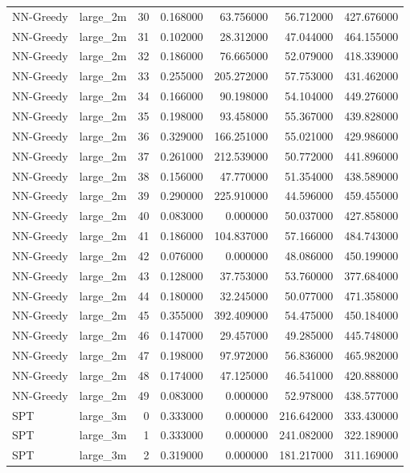 \begin{tabular}{llrrrrr}
NN-Greedy & large_2m & 30 & 0.168000 & 63.756000 & 56.712000 & 427.676000 \\
NN-Greedy & large_2m & 31 & 0.102000 & 28.312000 & 47.044000 & 464.155000 \\
NN-Greedy & large_2m & 32 & 0.186000 & 76.665000 & 52.079000 & 418.339000 \\
NN-Greedy & large_2m & 33 & 0.255000 & 205.272000 & 57.753000 & 431.462000 \\
NN-Greedy & large_2m & 34 & 0.166000 & 90.198000 & 54.104000 & 449.276000 \\
NN-Greedy & large_2m & 35 & 0.198000 & 93.458000 & 55.367000 & 439.828000 \\
NN-Greedy & large_2m & 36 & 0.329000 & 166.251000 & 55.021000 & 429.986000 \\
NN-Greedy & large_2m & 37 & 0.261000 & 212.539000 & 50.772000 & 441.896000 \\
NN-Greedy & large_2m & 38 & 0.156000 & 47.770000 & 51.354000 & 438.589000 \\
NN-Greedy & large_2m & 39 & 0.290000 & 225.910000 & 44.596000 & 459.455000 \\
NN-Greedy & large_2m & 40 & 0.083000 & 0.000000 & 50.037000 & 427.858000 \\
NN-Greedy & large_2m & 41 & 0.186000 & 104.837000 & 57.166000 & 484.743000 \\
NN-Greedy & large_2m & 42 & 0.076000 & 0.000000 & 48.086000 & 450.199000 \\
NN-Greedy & large_2m & 43 & 0.128000 & 37.753000 & 53.760000 & 377.684000 \\
NN-Greedy & large_2m & 44 & 0.180000 & 32.245000 & 50.077000 & 471.358000 \\
NN-Greedy & large_2m & 45 & 0.355000 & 392.409000 & 54.475000 & 450.184000 \\
NN-Greedy & large_2m & 46 & 0.147000 & 29.457000 & 49.285000 & 445.748000 \\
NN-Greedy & large_2m & 47 & 0.198000 & 97.972000 & 56.836000 & 465.982000 \\
NN-Greedy & large_2m & 48 & 0.174000 & 47.125000 & 46.541000 & 420.888000 \\
NN-Greedy & large_2m & 49 & 0.083000 & 0.000000 & 52.978000 & 438.577000 \\
SPT & large_3m & 0 & 0.333000 & 0.000000 & 216.642000 & 333.430000 \\
SPT & large_3m & 1 & 0.333000 & 0.000000 & 241.082000 & 322.189000 \\
SPT & large_3m & 2 & 0.319000 & 0.000000 & 181.217000 & 311.169000 \\

\end{tabular}

